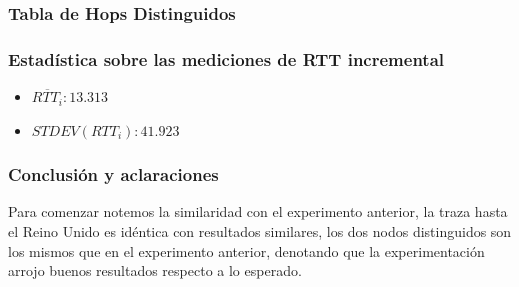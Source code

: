 \subsubsection{Tabla de Hops Distinguidos}
\begin{center}
\end{center}

\subsubsection{Estadística sobre las mediciones de RTT incremental}
\begin{itemize}
	\item $\overline{RTT_i}: 13.313$
	\item $STDEV(RTT_i): 41.923$
\end{itemize}

\subsubsection{Conclusión y aclaraciones}
Para comenzar notemos la similaridad con el experimento anterior, la traza hasta el Reino Unido es idéntica con resultados similares, los dos nodos distinguidos son los mismos que en el experimento anterior, denotando que la experimentación arrojo buenos resultados respecto a lo esperado. 
